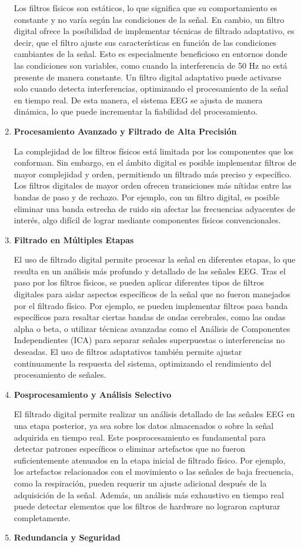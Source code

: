 \documentclass{article}
\begin{document}
\begin{enumerate}
    Los filtros físicos son estáticos, lo que significa que su comportamiento es constante y no varía según las condiciones de la señal. En cambio, un filtro digital ofrece la posibilidad de implementar técnicas de filtrado adaptativo, es decir, que el filtro ajuste sus características en función de las condiciones cambiantes de la señal. Esto es especialmente beneficioso en entornos donde las condiciones son variables, como cuando la interferencia de 50 Hz no está presente de manera constante. Un filtro digital adaptativo puede activarse solo cuando detecta interferencias, optimizando el procesamiento de la señal en tiempo real. De esta manera, el sistema EEG se ajusta de manera dinámica, lo que puede incrementar la fiabilidad del procesamiento.
    \item \textbf{Procesamiento Avanzado y Filtrado de Alta Precisión}
    
    La complejidad de los filtros físicos está limitada por los componentes que los conforman. Sin embargo, en el ámbito digital es posible implementar filtros de mayor complejidad y orden, permitiendo un filtrado más preciso y específico. Los filtros digitales de mayor orden ofrecen transiciones más nítidas entre las bandas de paso y de rechazo. Por ejemplo, con un filtro digital, es posible eliminar una banda estrecha de ruido sin afectar las frecuencias adyacentes de interés, algo difícil de lograr mediante componentes físicos convencionales.
    \item \textbf{Filtrado en Múltiples Etapas}
    
    El uso de filtrado digital permite procesar la señal en diferentes etapas, lo que resulta en un análisis más profundo y detallado de las señales EEG. Tras el paso por los filtros físicos, se pueden aplicar diferentes tipos de filtros digitales para aislar aspectos específicos de la señal que no fueron manejados por el filtrado físico. Por ejemplo, se pueden implementar filtros pasa banda específicos para resaltar ciertas bandas de ondas cerebrales, como las ondas alpha o beta, o utilizar técnicas avanzadas como el Análisis de Componentes Independientes (ICA) para separar señales superpuestas o interferencias no deseadas. El uso de filtros adaptativos también permite ajustar continuamente la respuesta del sistema, optimizando el rendimiento del procesamiento de señales.
    \item \textbf{Posprocesamiento y Análisis Selectivo}
    
    El filtrado digital permite realizar un análisis detallado de las señales EEG en una etapa posterior, ya sea sobre los datos almacenados o sobre la señal adquirida en tiempo real. Este posprocesamiento es fundamental para detectar patrones específicos o eliminar artefactos que no fueron suficientemente atenuados en la etapa inicial de filtrado físico. Por ejemplo, los artefactos relacionados con el movimiento o las señales de baja frecuencia, como la respiración, pueden requerir un ajuste adicional después de la adquisición de la señal. Además, un análisis más exhaustivo en tiempo real puede detectar elementos que los filtros de hardware no lograron capturar completamente.
    \item \textbf{Redundancia y Seguridad}
    

\end{enumerate}
\end{document}
